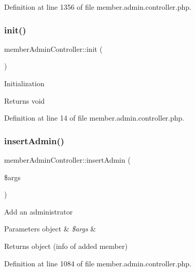 Definition at line 1356 of file member.\+admin.\+controller.\+php.

\mbox{\label{classmemberAdminController_a6c8b7afa8a1e9de99069b819d30d4f4f}} 
\subsubsection{\texorpdfstring{init()}{init()}}
{\footnotesize\ttfamily member\+Admin\+Controller\+::init (\begin{DoxyParamCaption}{ }\end{DoxyParamCaption})}

Initialization \begin{DoxyReturn}{Returns}
void 
\end{DoxyReturn}


Definition at line 14 of file member.\+admin.\+controller.\+php.

\mbox{\label{classmemberAdminController_ae2e8fdc055d7a9cc3b5eff067a709544}} 
\subsubsection{\texorpdfstring{insert\+Admin()}{insertAdmin()}}
{\footnotesize\ttfamily member\+Admin\+Controller\+::insert\+Admin (\begin{DoxyParamCaption}\item[{}]{\$args }\end{DoxyParamCaption})}

Add an administrator 
\begin{DoxyParams}[1]{Parameters}
object & {\em \$args} & \\
\hline
\end{DoxyParams}
\begin{DoxyReturn}{Returns}
object (info of added member) 
\end{DoxyReturn}


Definition at line 1084 of file member.\+admin.\+controller.\+php.

\mbox{\label{classmemberAdminController_a568d276708e1c5c4cf47d40741909b1a}} 
